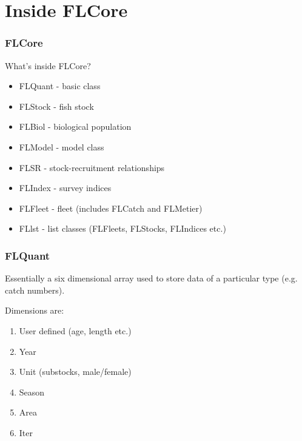 \documentclass{beamer}%
\begin{document}
\section{Inside FLCore}
\begin{frame}
  \frametitle{FLCore}
What's inside FLCore?
      \begin{itemize}
	 \item<2-> FLQuant - basic class
	 \item<3-> FLStock - fish stock
	 \item<4-> FLBiol - biological population
	 \item<5-> FLModel - model class
	 \item<6-> FLSR - stock-recruitment relationships
	 \item<7-> FLIndex - survey indices
	 \item<8-> FLFleet - fleet (includes FLCatch and FLMetier)
	 \item<9-> FLlst - list classes (FLFleets, FLStocks, FLIndices etc.)
      \end{itemize}
\end{frame}
\begin{frame}
  \frametitle{FLQuant}
Essentially a six dimensional array used to store data of a particular type (e.g. catch numbers).\newline

Dimensions are:
      \begin{enumerate}
	 \item<2-> User defined (age, length etc.)
	 \item<3-> Year
	 \item<4-> Unit (substocks, male/female)
	 \item<5-> Season
	 \item<6-> Area
	 \item<7-> Iter
      \end{enumerate}
\end{frame}
\end{document}
